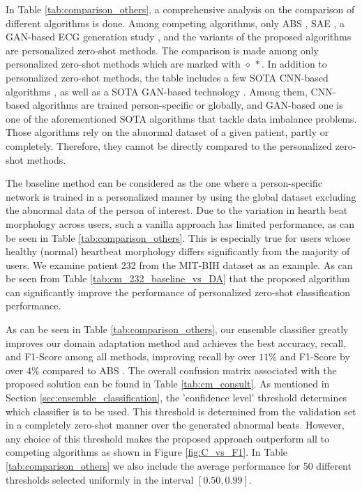 \documentclass[journal,transmag]{IEEEtran}
\begin{document}
In Table \ref{tab:comparison_others}, a comprehensive analysis on the comparison of different algorithms is done. Among competing algorithms, only ABS \cite{kiranyaz2017personalized}, SAE \cite{carrera2016ecg}, a GAN-based ECG generation study \cite{zhou2021fully}, and the variants of the proposed algorithms are personalized zero-shot methods. The comparison is made among only personalized zero-shot methods which are marked with $\diamond\,*$. In addition to personalized zero-shot methods, the table includes a few SOTA CNN-based algorithms \cite{kiranyaz2016real, zhai2018automated, li2019automated}, as well as a SOTA GAN-based technology \cite{shaker2020generalization}. Among them, CNN-based algorithms are trained person-specific or globally, and GAN-based one is one of the aforementioned SOTA algorithms that tackle data imbalance problems. Those algorithms rely on the abnormal dataset of a given patient, partly or completely. Therefore, they cannot be directly compared to the personalized zero-shot methods.

The baseline method can be considered as the one where a person-specific network is trained in a personalized manner by using the global dataset excluding the abnormal data of the person of interest. Due to the variation in hearth beat morphology across users, such a vanilla approach has limited performance, as can be seen in Table \ref{tab:comparison_others}. This is especially true for users whose healthy (normal) heartbeat morphology differs significantly from the majority of users. We examine patient 232 from the MIT-BIH dataset as an example. As can be seen from Table \ref{tab:cm_232_baseline_vs_DA} that the proposed algorithm can significantly improve the performance of personalized zero-shot classification performance.

As can be seen in Table \ref{tab:comparison_others}, our ensemble classifier greatly improves our domain adaptation method and achieves the best accuracy, recall, and F1-Score among all methods, improving recall by over $11\%$ and F1-Score by over $4\%$ compared to ABS \cite{kiranyaz2017personalized}. The overall confusion matrix associated with the proposed solution can be found in Table \ref{tab:cm_consult}. As mentioned in Section \ref{sec:ensemble_classification}, the 'confidence level' threshold determines which classifier is to be used. This threshold is determined from the validation set in a completely zero-shot manner over the generated abnormal beats. However, any choice of this threshold makes the proposed approach outperform all to competing algorithms as shown in Figure \ref{fig:C_vs_F1}. In Table \ref{tab:comparison_others} we also include the average performance for 50 different thresholds selected uniformly in the interval $[0.50, 0.99]$.
\end{document}
